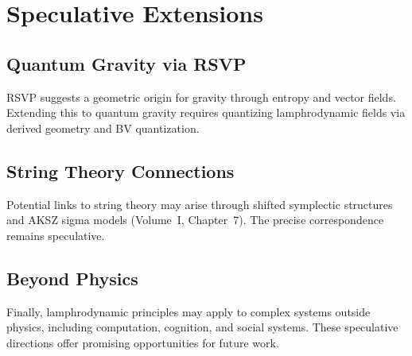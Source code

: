 
\chapter{Speculative Extensions}
\label{chap:speculative-extensions}

\section{Quantum Gravity via RSVP}

RSVP suggests a geometric origin for gravity through entropy and vector
fields. Extending this to quantum gravity requires quantizing lamphrodynamic
fields via derived geometry and BV quantization.

\section{String Theory Connections}

Potential links to string theory may arise through shifted symplectic
structures and AKSZ sigma models (Volume~I, Chapter~7). The precise
correspondence remains speculative.

\section{Beyond Physics}

Finally, lamphrodynamic principles may apply to complex systems outside
physics, including computation, cognition, and social systems. These
speculative directions offer promising opportunities for future work.


\newpage
